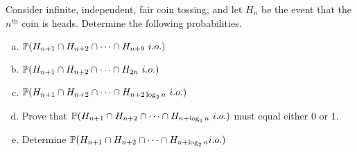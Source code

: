 \begin{problem}
	Consider infinite, independent, fair coin tossing, and let $ H_n $ be the event that the $ n^\text{th} $ coin is heads. Determine the following probabilities.
	\begin{enumerate}[(a)]
		\item $ \mathbb{P}(H_{n+1}\cap H_{n+2} \cap \cdots\cap H_{n+9}\ i.o.) $
		\item $ \mathbb{P}(H_{n+1}\cap H_{n+2}\cap \cdots\cap H_{2n}\ i.o.) $
		\item $ \mathbb{P}(H_{n+1}\cap H_{n+2}\cap \cdots \cap H_{n+2\log_2 n}\ i.o.) $
		\item Prove that $ \mathbb{P}(H_{n+1}\cap H_{n+2}\cap\cdots\cap H_{n+\log_2n}\ i.o.) $ must equal either 0 or 1.
		\item Determine $ \mathbb{P}(H_{n+1}\cap H_{n+2}\cap \cdots \cap H_{n+\log_2n} i.o.) $
	\end{enumerate}
\end{problem}
